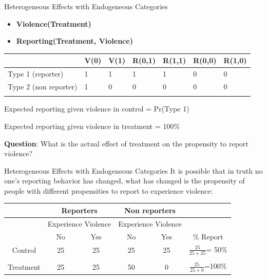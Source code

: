 \documentclass[
  11pt,
  ignorenonframetext,
]{beamer}
\providecommand{\tightlist}{%
  \setlength{\itemsep}{0pt}\setlength{\parskip}{0pt}}\usepackage{longtable,booktabs,array}
\begin{document}
\begin{frame}{Heterogeneous Effects with Endogeneous Categories}
\protect\hypertarget{heterogeneous-effects-with-endogeneous-categories-2}{}
\begin{itemize}
\tightlist
\item
  \textbf{Violence(Treatment)}
\item
  \textbf{Reporting(Treatment, Violence)}
\end{itemize}

\begin{longtable}[]{@{}lllllll@{}}
\toprule\noalign{}
& V(0) & V(1) & R(0,1) & R(1,1) & R(0,0) & R(1,0) \\
\midrule\noalign{}
\endhead
Type 1 (reporter) & 1 & 1 & 1 & 1 & 0 & 0 \\
Type 2 (non reporter) & 1 & 0 & 0 & 0 & 0 & 0 \\
\bottomrule\noalign{}
\end{longtable}

Expected reporting given violence in control = Pr(Type 1)

Expected reporting given violence in treatment = 100\%

\textbf{Question}: What is the actual effect of treatment on the
propensity to report violence?
\end{frame}

\begin{frame}{Heterogeneous Effects with Endogeneous Categories}
\protect\hypertarget{heterogeneous-effects-with-endogeneous-categories-3}{}
It is possible that in truth no one's reporting behavior has changed,
what has changed is the propensity of people with different propensities
to report to experience violence:

\begin{table}
\centering
\begin{tabular}{c|cc|cc|c}\scriptsize

           & \multicolumn{ 2}{c}{Reporters} & \multicolumn{ 2}{c}{Non reporters} &            \\ \hline
           & \multicolumn{ 2}{c}{Experience Violence} & \multicolumn{ 2}{c}{Experience Violence} &            \\ \hline \hline
           &         No &        Yes &        No  &        Yes &  \% Report \\

   Control &         25 &         {25} &         25 &        {25} &       { $\frac{25}{25+25}$}= 50\% \\  
   & & & & \\
  Treatment &         25 &         {25} &         50 &          {0} &      {$\frac{25}{25+0}$}=100\% \\ \hline

\end{tabular}  
\end{table}
\end{frame}
\end{document}
